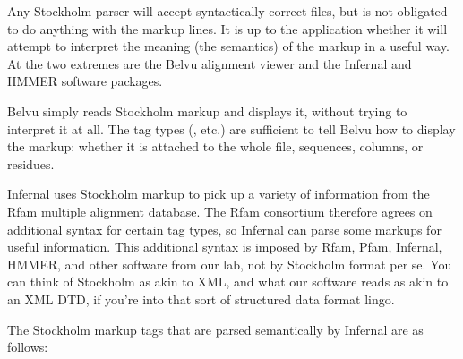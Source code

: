 Any Stockholm parser will accept syntactically correct files, but is
not obligated to do anything with the markup lines. It is up to the
application whether it will attempt to interpret the meaning (the
semantics) of the markup in a useful way. At the two extremes are the
Belvu alignment viewer and the Infernal and HMMER 
software packages.

Belvu simply reads Stockholm markup and displays it, without trying to
interpret it at all. The tag types (, etc.) are sufficient
to tell Belvu how to display the markup: whether it is attached to the
whole file, sequences, columns, or residues.

Infernal uses Stockholm markup to pick up a variety of information
from the Rfam multiple alignment database. The Rfam consortium
therefore agrees on additional syntax for certain tag types, so
Infernal can parse some markups for useful information. This
additional syntax is imposed by Rfam, Pfam, Infernal, HMMER, and other
software from our lab, not by Stockholm format per se. You can think
of Stockholm as akin to XML, and what our software reads as akin
to an XML DTD, if you're into that sort of structured data format
lingo.

The Stockholm markup tags that are parsed semantically by Infernal
are as follows:

